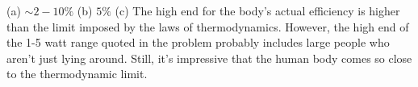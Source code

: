 (a) $\sim 2-10\%$ (b) $5\%$ (c) The high end for the body's
actual efficiency is higher than the limit imposed by the
laws of thermodynamics. However, the high end of the 1-5 watt range
quoted in the problem probably includes large people who aren't
just lying around. Still, it's impressive that the human body
comes so close to the thermodynamic limit.




